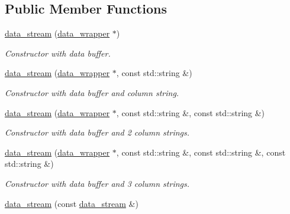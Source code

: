 \subsection*{Public Member Functions}
\begin{DoxyCompactItemize}
\item 
\hypertarget{a00117_ab75592c53569323eac9cf92b62ada9d2}{\hyperlink{a00117_ab75592c53569323eac9cf92b62ada9d2}{data\-\_\-stream} (\hyperlink{a00118}{data\-\_\-wrapper} $\ast$)}\label{a00117_ab75592c53569323eac9cf92b62ada9d2}

\begin{DoxyCompactList}\small\item\em Constructor with data buffer. \end{DoxyCompactList}\item 
\hypertarget{a00117_ac421009ddaaf089e6193c23747f93ed7}{\hyperlink{a00117_ac421009ddaaf089e6193c23747f93ed7}{data\-\_\-stream} (\hyperlink{a00118}{data\-\_\-wrapper} $\ast$, const std\-::string \&)}\label{a00117_ac421009ddaaf089e6193c23747f93ed7}

\begin{DoxyCompactList}\small\item\em Constructor with data buffer and column string. \end{DoxyCompactList}\item 
\hypertarget{a00117_aa76a5153380208b3a112689e20611a67}{\hyperlink{a00117_aa76a5153380208b3a112689e20611a67}{data\-\_\-stream} (\hyperlink{a00118}{data\-\_\-wrapper} $\ast$, const std\-::string \&, const std\-::string \&)}\label{a00117_aa76a5153380208b3a112689e20611a67}

\begin{DoxyCompactList}\small\item\em Constructor with data buffer and 2 column strings. \end{DoxyCompactList}\item 
\hypertarget{a00117_a8d83e622d90df4b96208dde7e49b52ad}{\hyperlink{a00117_a8d83e622d90df4b96208dde7e49b52ad}{data\-\_\-stream} (\hyperlink{a00118}{data\-\_\-wrapper} $\ast$, const std\-::string \&, const std\-::string \&, const std\-::string \&)}\label{a00117_a8d83e622d90df4b96208dde7e49b52ad}

\begin{DoxyCompactList}\small\item\em Constructor with data buffer and 3 column strings. \end{DoxyCompactList}\item 
\hypertarget{a00117_a1372f7f4582c3f38a39598da73ef10e3}{\hyperlink{a00117_a1372f7f4582c3f38a39598da73ef10e3}{data\-\_\-stream} (const \hyperlink{a00117}{data\-\_\-stream} \&)}\label{a00117_a1372f7f4582c3f38a39598da73ef10e3}


\end{DoxyCompactItemize}
